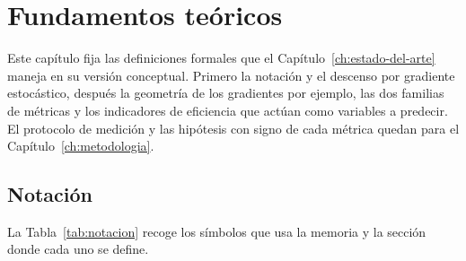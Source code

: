 \chapter{Fundamentos teóricos}
\label{ch:fundamentos}

Este capítulo fija las definiciones formales que el Capítulo~\ref{ch:estado-del-arte} maneja en su versión conceptual. Primero la notación y el descenso por gradiente estocástico, después la geometría de los gradientes por ejemplo, las dos familias de métricas y los indicadores de eficiencia que actúan como variables a predecir. El protocolo de medición y las hipótesis con signo de cada métrica quedan para el Capítulo~\ref{ch:metodologia}.

\section{Notación}
\label{sec:notacion}

La Tabla~\ref{tab:notacion} recoge los símbolos que usa la memoria y la sección donde cada uno se define.

